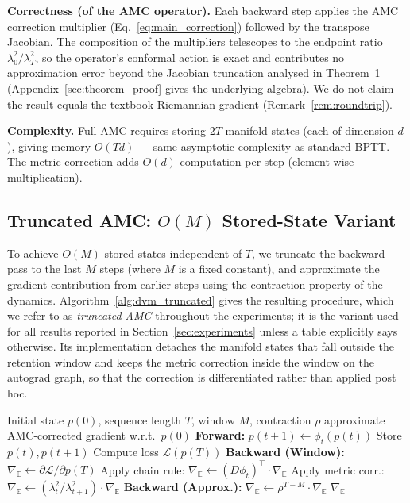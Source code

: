 \documentclass[a4paper,fleqn]{cas-dc}
\begin{document}
\textbf{Correctness (of the AMC operator).} Each backward step applies the AMC correction multiplier (Eq.~\eqref{eq:main_correction}) followed by the transpose Jacobian. The composition of the multipliers telescopes to the endpoint ratio $\lambda_0^2/\lambda_T^2$, so the operator's conformal action is exact and contributes no approximation error beyond the Jacobian truncation analysed in Theorem~1 (Appendix~\ref{sec:theorem_proof} gives the underlying algebra). We do not claim the result equals the textbook Riemannian gradient (Remark~\ref{rem:roundtrip}).

\textbf{Complexity.} Full AMC requires storing $2T$ manifold states (each of dimension $d$), giving memory $O(Td)$ — same asymptotic complexity as standard BPTT. The metric correction adds $O(d)$ computation per step (element-wise multiplication).

\subsection{Truncated AMC: \texorpdfstring{$O(M)$}{O(M)} Stored-State Variant}

To achieve $O(M)$ stored states independent of $T$, we truncate the backward pass to the last $M$ steps (where $M$ is a fixed constant), and approximate the gradient contribution from earlier steps using the contraction property of the dynamics. Algorithm~\ref{alg:dvm_truncated} gives the resulting procedure, which we refer to as \emph{truncated AMC} throughout the experiments; it is the variant used for all results reported in Section~\ref{sec:experiments} unless a table explicitly says otherwise. Its implementation detaches the manifold states that fall outside the retention window and keeps the metric correction inside the window on the autograd graph, so that the correction is differentiated rather than applied post hoc.

\begin{algorithm}[htbp]
\footnotesize
\caption{Truncated AMC with $O(M)$ Stored States}
\label{alg:dvm_truncated}
\begin{algorithmic}[1]
\Require Initial state $p(0)$, sequence length $T$, window $M$, contraction $\rho$
\Ensure approximate AMC-corrected gradient w.r.t.\ $p(0)$
\State \textbf{Forward:}
    \State $p(t+1) \leftarrow \phi_t(p(t))$
        \State Store $p(t), p(t+1)$ 
    \EndIf
\EndFor
\State Compute loss $\mathcal{L}(p(T))$
\State \textbf{Backward (Window):}
\State $\nabla_{\mathbb{E}} \leftarrow \partial\mathcal{L}/\partial p(T)$
    \State Apply chain rule: $\nabla_{\mathbb{E}} \leftarrow (D\phi_t)^\top \cdot \nabla_{\mathbb{E}}$
    \State Apply metric corr.: $\nabla_{\mathbb{E}} \leftarrow (\lambda_t^2/\lambda_{t+1}^2) \cdot \nabla_{\mathbb{E}}$
\EndFor
\State \textbf{Backward (Approx.):}
\State $\nabla_{\mathbb{E}} \leftarrow \rho^{T-M} \cdot \nabla_{\mathbb{E}}$ 
\State \Return $\nabla_{\mathbb{E}}$
\end{algorithmic}
\end{algorithm}
\end{document}
